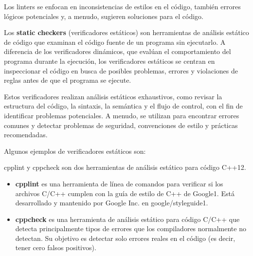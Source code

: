 \documentclass[../main.tex]{subfiles}
\begin{document}
        Los linters se enfocan en inconsistencias de estilos en el código, también errores lógicos potenciales y, a menudo, sugieren soluciones para el código.


        Los \textbf{static checkers} (verificadores estáticos) son herramientas de análisis estático de código que examinan el código fuente de un programa sin ejecutarlo. A diferencia de los verificadores dinámicos, que evalúan el comportamiento del programa durante la ejecución, los verificadores estáticos se centran en inspeccionar el código en busca de posibles problemas, errores y violaciones de reglas antes de que el programa se ejecute.

        Estos verificadores realizan análisis estáticos exhaustivos, como revisar la estructura del código, la sintaxis, la semántica y el flujo de control, con el fin de identificar problemas potenciales. A menudo, se utilizan para encontrar errores comunes y detectar problemas de seguridad, convenciones de estilo y prácticas recomendadas.
        
        Algunos ejemplos de verificadores estáticos son:

        cpplint y cppcheck son dos herramientas de análisis estático para código C++12.
        \begin{itemize}
            \item \textbf{cpplint} es una herramienta de línea de comandos para verificar si los archivos C/C++ cumplen con la guía de estilo de C++ de Google1. Está desarrollado y mantenido por Google Inc. en google/styleguide1. 
            \item \textbf{cppcheck} es una herramienta de análisis estático para código C/C++ que detecta principalmente tipos de errores que los compiladores normalmente no detectan. Su objetivo es detectar solo errores reales en el código (es decir, tener cero falsos positivos).
        \end{itemize}
\end{document}
